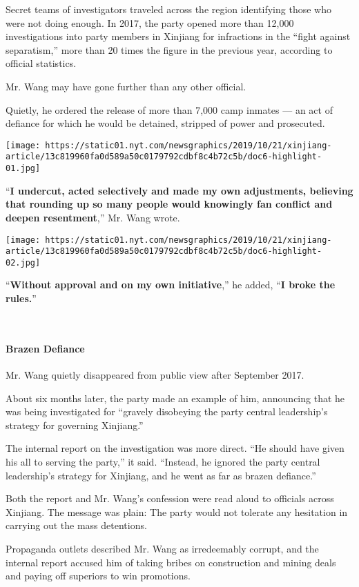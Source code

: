 Secret teams of investigators traveled across the region identifying
those who were not doing enough. In 2017, the party opened more than
12,000 investigations into party members in Xinjiang for infractions in
the ``fight against separatism,'' more than 20 times the figure in the
previous year, according to official statistics.

Mr. Wang may have gone further than any other official.

Quietly, he ordered the release of more than 7,000 camp inmates --- an
act of defiance for which he would be detained, stripped of power and
prosecuted.

\texttt{[image: https://static01.nyt.com/newsgraphics/2019/10/21/xinjiang-article/13c819960fa0d589a50c0179792cdbf8c4b72c5b/doc6-highlight-01.jpg]}

``\textbf{I undercut, acted selectively and made my own adjustments,
believing that rounding up so many people would knowingly fan conflict
and deepen resentment},'' Mr. Wang wrote.

\texttt{[image: https://static01.nyt.com/newsgraphics/2019/10/21/xinjiang-article/13c819960fa0d589a50c0179792cdbf8c4b72c5b/doc6-highlight-02.jpg]}

``\textbf{Without approval and on my own initiative},'' he added,
``\textbf{I broke the rules.}''

​

\hypertarget{-brazen-defiance-}{%
\paragraph{ Brazen Defiance }\label{-brazen-defiance-}}

Mr. Wang quietly disappeared from public view after September 2017.

About six months later, the party made an example of him, announcing
that he was being investigated for ``gravely disobeying the party
central leadership's strategy for governing Xinjiang.''

The internal report on the investigation was more direct. ``He should
have given his all to serving the party,'' it said. ``Instead, he
ignored the party central leadership's strategy for Xinjiang, and he
went as far as brazen defiance.''

Both the report and Mr. Wang's confession were read aloud to officials
across Xinjiang. The message was plain: The party would not tolerate any
hesitation in carrying out the mass detentions.

Propaganda outlets described Mr. Wang as irredeemably corrupt, and the
internal report accused him of taking bribes on construction and mining
deals and paying off superiors to win promotions.

